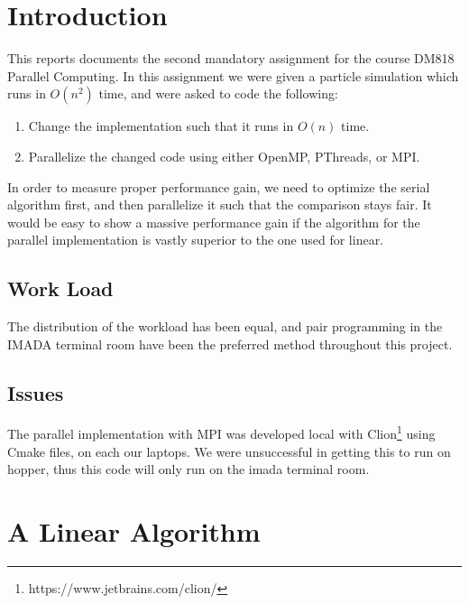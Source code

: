 \documentclass[a4paper,11pt,oneside]{book}
\begin{document}
\pagestyle{ruled}
\chapter{Introduction}
\setcounter{section}{1}

This reports documents the second mandatory assignment for the course DM818 Parallel Computing. In this assignment we
were given a particle simulation which runs in $O(n^{2})$ time, and were asked to code the following:

\begin{enumerate}
\item Change the implementation such that it runs in $O(n)$ time.
\item Parallelize the changed code using either OpenMP, PThreads, or MPI.
\end{enumerate}

In order to measure proper performance gain, we need to optimize the serial algorithm first, and then parallelize it
such that the comparison stays fair. It would be easy to show a massive performance gain if the algorithm for the
parallel implementation is vastly superior to the one used for linear.
 
\section{Work Load}


The distribution of the workload has been equal, and pair programming in the IMADA terminal room have been the preferred
method throughout this project.

\section{Issues}
The parallel implementation with MPI was developed local with Clion\footnote{https://www.jetbrains.com/clion/} using Cmake files, on each our laptops. We were unsuccessful in getting this to run on hopper, thus this code will only run on the imada terminal room.

\chapter{A Linear Algorithm}
\end{document}
